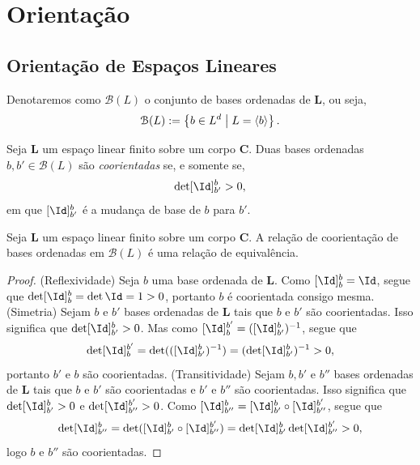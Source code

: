 \section{Orientação}

\subsection{Orientação de Espaços Lineares}

Denotaremos como $\mathcal{B}(L)$ o conjunto de bases ordenadas de $\bm L$, ou seja,
	\begin{equation*}
	\mathcal{B}(L) := \left\{b \in L^d \;\middle\vert\; L = \left\langle b \right\rangle \right\}.
	\end{equation*}

\begin{defi}
Seja $\bm L$ um espaço linear finito sobre um corpo $\bm C$. Duas bases ordenadas $b, b' \in \mathcal{B}(L)$ são \emph{coorientadas} se, e somente se,
	\begin{equation*}
	\det [\Id]^b_{b'} > 0,
	\end{equation*}
em que $[\Id]_{b'}^b$ é a mudança de base de $b$ para $b'$.
\end{defi}

\begin{prop}
Seja $\bm L$ um espaço linear finito sobre um corpo $\bm C$. A relação de coorientação de bases ordenadas em $\mathcal{B}(L)$ é uma relação de equivalência.
\end{prop}
\begin{proof}
(Reflexividade) Seja $b$ uma base ordenada de $\bm L$. Como $[\Id]^b_b = \Id$, segue que $\det [\Id]^b_b = \det \Id = 1 >0$, portanto $b$ é coorientada consigo mesma.
(Simetria) Sejam $b$ e $b'$ bases ordenadas de $\bm L$ tais que $b$ e $b'$ são coorientadas. Isso significa que $\det [\Id]^b_{b'} >0$. Mas como $[\Id]_b^{b'} = ([\Id]^b_{b'})\inv$, segue que
	\begin{equation*}
	\det [\Id]_b^{b'} = \det(([\Id]^b_{b'})\inv) = (\det [\Id]^b_{b'})\inv > 0,
	\end{equation*}
portanto $b'$ e $b$ são coorientadas.
(Transitividade) Sejam $b,b'$ e $b''$ bases ordenadas de $\bm L$ tais que $b$ e $b'$ são coorientadas e $b'$ e $b''$ são coorientadas. Isso significa que $\det [\Id]^b_{b'} > 0$ e $\det [\Id]^{b'}_{b''} > 0$. Como $[\Id]^b_{b''} = [\Id]^b_{b'} \circ [\Id]^{b'}_{b''}$, segue que
	\begin{equation*}
	\det [\Id]^b_{b''} = \det ( [\Id]^b_{b'} \circ [\Id]^{b'}_{b''}) = \det  [\Id]^b_{b'} \det [\Id]^{b'}_{b''} > 0,
	\end{equation*}
logo $b$ e $b''$ são coorientadas.
\end{proof}

